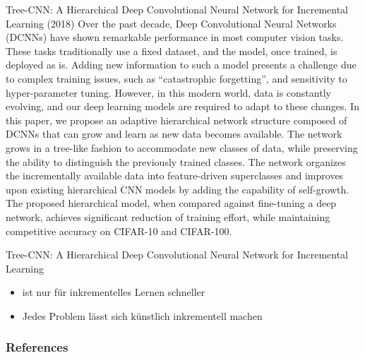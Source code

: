 \documentclass[10pt]{beamer}
\begin{document}
\begin{frame}{Tree-CNN: A Hierarchical Deep Convolutional Neural
Network for Incremental Learning (2018)}
Over the past decade, Deep Convolutional Neural Networks (DCNNs) have shown remarkable performance in most computer vision tasks. These tasks traditionally use a fixed dataset, and the model, once trained, is deployed as is. Adding new information to such a model presents a challenge due to complex training issues, such as “catastrophic forgetting”, and sensitivity to hyper-parameter tuning. However, in this modern world, data is constantly evolving, and our deep learning models are required to adapt to these changes. In this paper, we propose an adaptive hierarchical network structure composed of DCNNs that can grow and learn as new data becomes available. The network grows in a tree-like fashion to accommodate new classes of data, while preserving the ability to distinguish the previously trained classes. The network organizes the incrementally available data into feature-driven superclasses and improves upon existing hierarchical CNN models by adding the capability of self-growth. The proposed hierarchical model, when compared against fine-tuning a deep network, achieves significant reduction of training effort, while maintaining competitive accuracy on CIFAR-10 and CIFAR-100.
\end{frame}


\begin{frame}{Tree-CNN: A Hierarchical Deep Convolutional Neural
Network for Incremental Learning}
\begin{itemize}
 \item ist nur für inkrementelles Lernen schneller
 \item Jedes Problem lässt sich künstlich inkrementell machen
\end{itemize}

\end{frame}



\begin{frame}[allowframebreaks]
\nocite{*}
\frametitle{References}
\printbibliography
\end{frame}
\end{document}
